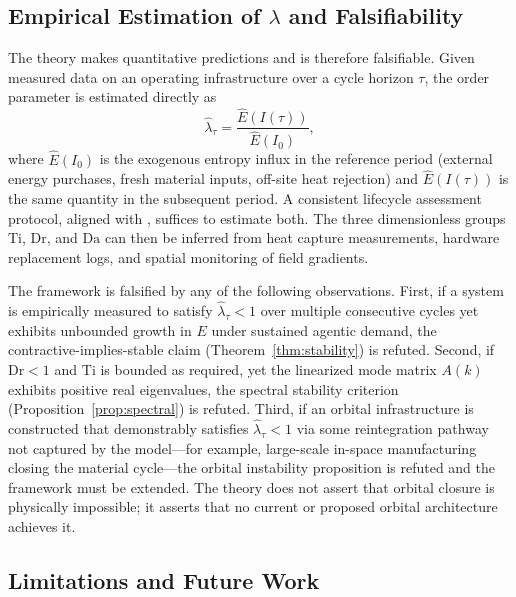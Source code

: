 \documentclass[10pt,twocolumn]{article}
\theoremstyle{plain}
\theoremstyle{definition}
\theoremstyle{remark}
\begin{document}
\subsection{Empirical Estimation of $\lambda$ and Falsifiability}

The theory makes quantitative predictions and is therefore falsifiable.
Given measured data on an operating infrastructure over a cycle horizon
$\tau$, the order parameter is estimated directly as
\[
  \hat\lambda_\tau = \frac{\hat E(I(\tau))}{\hat E(I_0)},
\]
where $\hat E(I_0)$ is the exogenous entropy influx in the reference
period (external energy purchases, fresh material inputs, off-site heat
rejection) and $\hat E(I(\tau))$ is the same quantity in the subsequent
period. A consistent lifecycle assessment protocol, aligned with
\citet{eu2023}, suffices to estimate both. The three dimensionless
groups $\mathrm{Ti}$, $\mathrm{Dr}$, and $\mathrm{Da}$ can then be
inferred from heat capture measurements, hardware replacement logs, and
spatial monitoring of field gradients.

The framework is falsified by any of the following observations. First,
if a system is empirically measured to satisfy $\hat\lambda_\tau < 1$
over multiple consecutive cycles yet exhibits unbounded growth in $E$
under sustained agentic demand, the contractive-implies-stable claim
(Theorem~\ref{thm:stability}) is refuted. Second, if $\mathrm{Dr} < 1$
and $\mathrm{Ti}$ is bounded as required, yet the linearized mode
matrix $A(k)$ exhibits positive real eigenvalues, the spectral stability
criterion (Proposition~\ref{prop:spectral}) is refuted. Third, if an
orbital infrastructure is constructed that demonstrably satisfies
$\hat\lambda_\tau < 1$ via some reintegration pathway not captured by
the model---for example, large-scale in-space manufacturing closing the
material cycle---the orbital instability proposition is refuted and the
framework must be extended. The theory does not assert that orbital
closure is physically impossible; it asserts that no current or proposed
orbital architecture achieves it.

\subsection{Limitations and Future Work}
\end{document}
